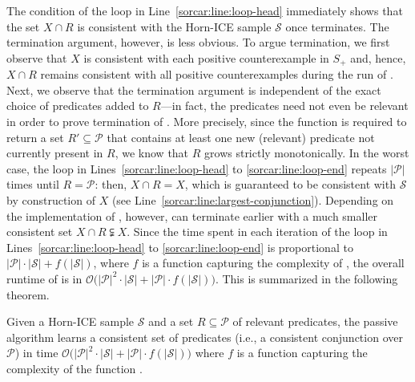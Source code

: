 The condition of the loop in Line~\ref{sorcar:line:loop-head} immediately shows that the set $X \cap R$ is consistent with the Horn-ICE sample $\mathcal S$ once \SorcarPassive terminates.
The termination argument, however, is less obvious.
To argue termination, we first observe that $X$ is consistent with each positive counterexample in $S_+$ and, hence, $X \cap R$ remains consistent with all positive counterexamples during the run of \SorcarPassive.
Next, we observe that the termination argument is independent of the exact choice of predicates added to $R$---in fact, the predicates need not even be relevant in order to prove termination of \SorcarPassive.
More precisely, since the function \RelevantPredicates is required to return a set $R' \subseteq \mathcal P$ that contains at least one new (relevant) predicate not currently present in $R$, we know that $R$ grows strictly monotonically.
In the worst case, the loop in Lines~\ref{sorcar:line:loop-head} to \ref{sorcar:line:loop-end} repeats $|\mathcal P|$ times until $R = \mathcal P$:
then, $X \cap R = X$, which is guaranteed to be consistent with $\mathcal S$ by construction of $X$ (see Line~\ref{sorcar:line:largest-conjunction}).
Depending on the implementation of \RelevantPredicates, however, \SorcarPassive can terminate earlier with a much smaller consistent set $X \cap R \subsetneqq X$.
Since the time spent in each iteration of the loop in Lines~\ref{sorcar:line:loop-head} to \ref{sorcar:line:loop-end} is proportional to $|\mathcal P| \cdot |\mathcal S| + f(|\mathcal S|)$, where $f$ is a function capturing the complexity of \RelevantPredicates, the overall runtime of \SorcarPassive is in $\mathcal O \bigl( |\mathcal P|^2 \cdot |\mathcal S| + |\mathcal P| \cdot f(|\mathcal S|) \bigr)$.
This is summarized in the following theorem.

\begin{theorem} \label{thm:passive_sorcar}
Given a Horn-ICE sample $\mathcal S$ and a set $R \subseteq \mathcal P$ of relevant predicates, the passive \sorcar algorithm learns a consistent set of predicates (i.e., a consistent conjunction over $\mathcal P$) in time $\mathcal O \bigl( |\mathcal P|^2 \cdot |\mathcal S| + |\mathcal P| \cdot f(|\mathcal S|) \bigr)$ where $f$ is a function capturing the complexity of the function \RelevantPredicates.
\end{theorem}

